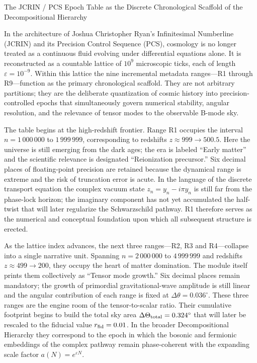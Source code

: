 The JCRIN / PCS Epoch Table as the Discrete Chronological Scaffold of the Decompositional Hierarchy

In the architecture of Joshua Christopher Ryan’s Infinitesimal Numberline (JCRIN) and its Precision Control Sequence (PCS), cosmology is no longer treated as a continuous fluid evolving under differential equations alone. It is reconstructed as a countable lattice of \(10^9\) microscopic ticks, each of length \(\varepsilon = 10^{-9}\). Within this lattice the nine incremental metadata ranges—R1 through R9—function as the primary chronological scaffold. They are not arbitrary partitions; they are the deliberate quantization of cosmic history into precision-controlled epochs that simultaneously govern numerical stability, angular resolution, and the relevance of tensor modes to the observable B-mode sky.

The table begins at the high-redshift frontier. Range R1 occupies the interval \(n = 1\,000\,000\) to \(1\,999\,999\), corresponding to redshifts \(z \approx 999 \to 500.5\). Here the universe is still emerging from the dark ages; the era is labeled “Early matter” and the scientific relevance is designated “Reionization precursor.” Six decimal places of floating-point precision are retained because the dynamical range is extreme and the risk of truncation error is acute. In the language of the discrete transport equation the complex vacuum state \(z_n = y_n - i\pi y_n\) is still far from the phase-lock horizon; the imaginary component has not yet accumulated the half-twist that will later regularize the Schwarzschild pathway. R1 therefore serves as the numerical and conceptual foundation upon which all subsequent structure is erected.

As the lattice index advances, the next three ranges—R2, R3 and R4—collapse into a single narrative unit. Spanning \(n = 2\,000\,000\) to \(4\,999\,999\) and redshifts \(z \approx 499 \to 200\), they occupy the heart of matter domination. The module itself prints them collectively as “Tensor mode growth.” Six decimal places remain mandatory; the growth of primordial gravitational-wave amplitude is still linear and the angular contribution of each range is fixed at \(\Delta\theta = 0.036^\circ\). These three ranges are the engine room of the tensor-to-scalar ratio. Their cumulative footprint begins to build the total sky area \(\Delta\Theta_{\rm total} = 0.324^\circ\) that will later be rescaled to the fiducial value \(r_{\rm fid} = 0.01\). In the broader Decompositional Hierarchy they correspond to the epoch in which the bosonic and fermionic embeddings of the complex pathway remain phase-coherent with the expanding scale factor \(a(N) = e^{\varepsilon N}\).

